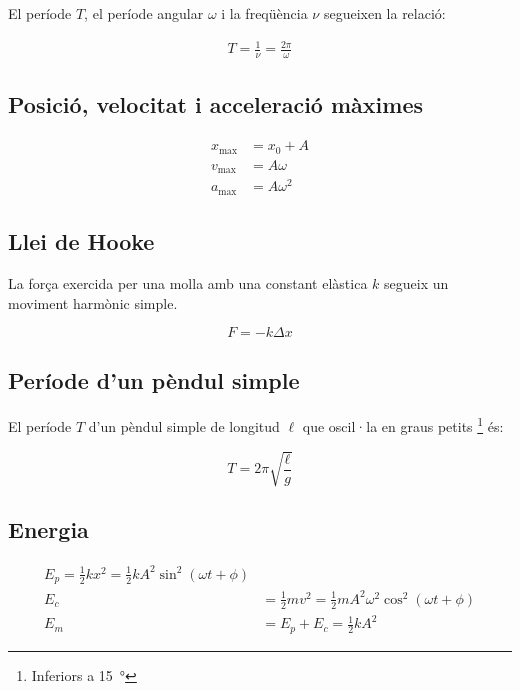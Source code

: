 El període $T$, el període angular $\omega$ i la freqüència $\nu$ segueixen la
relació:

\begin{align}
    T = \frac{1}{\nu} = \frac{2\pi}{\omega}
\end{align}

\subsection{Posició, velocitat i acceleració màximes}
\label{sub:posicio_velocitat_i_acceleracio_maximes}


\begin{align}
    x_\mathrm{max} &= x_0 + A \\
    v_\mathrm{max} &= A\omega \\
    a_\mathrm{max} &= A\omega^2
\end{align}

\subsection{Llei de Hooke}
\label{sub:llei_de_hooke}

La força exercida per una molla amb una constant elàstica $k$ segueix un
moviment harmònic simple.

\begin{equation}
    F = -k\Delta x
\end{equation}

\subsection{Període d'un pèndul simple}
\label{sub:periode_d_un_pendul_simple}

El període $T$ d'un pèndul simple de longitud $\ell$ que oscil·la en graus petits \footnote{Inferiors a \SI{15}{\degree}} és:

\begin{equation}
    T=2\pi\sqrt{\frac{\ell}{g}}
\end{equation}

\subsection{Energia}
\label{sub:energia}

\begin{align}
    E_p = \frac{1}{2}kx^2 = \frac{1}{2}kA^2\sin^2\left(\omega t + \phi\right) \\
    E_c &= \frac{1}{2}mv^2 = \frac{1}{2}mA^2\omega^2\cos^2\left(\omega t + \phi\right) \\
    E_m &= E_p + E_c = \frac{1}{2}kA^2
\end{align}

